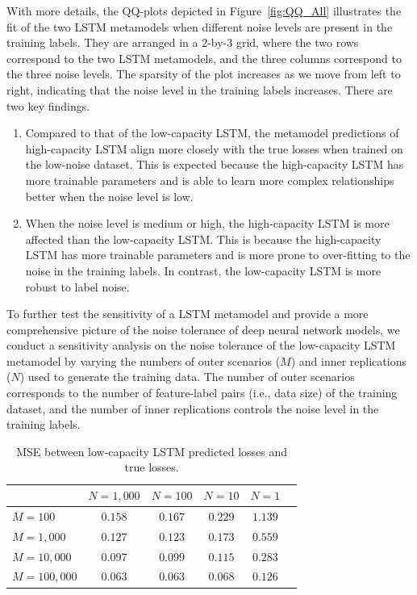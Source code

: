 \documentclass{article}
\begin{document}
With more details, the QQ-plots depicted in Figure~\ref{fig:QQ_All} illustrates the fit of the two LSTM metamodels when different noise levels are present in the training labels.
They are arranged in a 2-by-3 grid, where the two rows correspond to the two LSTM metamodels, and the three columns correspond to the three noise levels.
The sparsity of the plot increases as we move from left to right, indicating that the noise level in the training labels increases.
There are two key findings.
\begin{enumerate}
    \item   Compared to that of the low-capacity LSTM, the metamodel predictions of high-capacity LSTM align more closely with the true losses when trained on the low-noise dataset.
    This is expected because the high-capacity LSTM has more trainable parameters and is able to learn more complex relationships better when the noise level is low.
    \item   When the noise level is medium or high, the high-capacity LSTM is more affected than the low-capacity LSTM.
    This is because the high-capacity LSTM has more trainable parameters and is more prone to over-fitting to the noise in the training labels.
    In contrast, the low-capacity LSTM is more robust to label noise.
\end{enumerate}

To further test the sensitivity of a LSTM metamodel and provide a more comprehensive picture of the noise tolerance of deep neural network models, we conduct a sensitivity analysis on the noise tolerance of the low-capacity LSTM metamodel by varying the numbers of outer scenarios ($M$) and inner replications ($N$) used to generate the training data.
The number of outer scenarios corresponds to the number of feature-label pairs (i.e., data size) of the training dataset, and the number of inner replications controls the noise level in the training labels.

\begin{table}[ht!]
    \small
    \centering
    \begin{tabular}{lccccc}
        \toprule
                          & $N=1\!,\!000$ & $N=100$       & $N=10$        & $N=1$ \\
        \midrule
        $M = 100$         & $0.158$ & $0.167$ & $0.229$ & $1.139$ \\
        $M = 1\!,\!000$   & $0.127$ & $0.123$ & $0.173$ & $0.559$ \\
        $M = 10\!,\!000$  & $0.097$ & $0.099$ & $0.115$ & $0.283$ \\
        $M = 100\!,\!000$ & $0.063$ & $0.063$ & $0.068$ & $0.126$ \\
        \bottomrule
    \end{tabular}
    \caption{MSE between low-capacity LSTM predicted losses and true losses.}
    \label{tab:lstm_sens}
\end{table}
\end{document}
